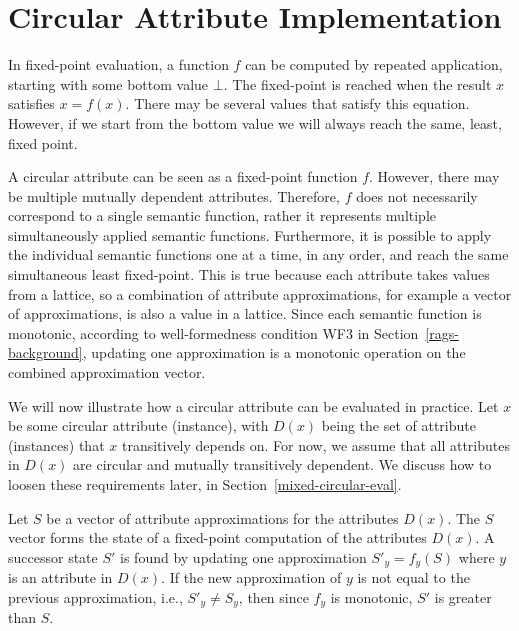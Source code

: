 {\section{Circular Attribute Implementation}
\label{circular-implementation}


In fixed-point evaluation, a function $f$ can be computed by repeated application, starting with
some bottom value $\bot$.
The fixed-point is reached when the result $x$ satisfies $x = f(x)$.
There may be several values that satisfy this equation. However, if we start from the
bottom value we will always reach the same, least, fixed point.

A circular attribute can be seen as a fixed-point function $f$. However, there may be
multiple mutually dependent attributes. Therefore, $f$ does not necessarily correspond
to a single semantic function, rather it represents multiple simultaneously
applied semantic functions.  Furthermore, it is possible to apply the individual semantic
functions one at a time, in any order, and reach the same simultaneous least
fixed-point. This is true because each attribute takes values from a lattice, so a combination of
attribute approximations, for example a vector of approximations,
is also a value in a lattice. Since each semantic function is monotonic,
according to well-formedness condition WF3 in Section~\ref{rags-background},
updating one approximation is a monotonic operation on the combined approximation vector.


We will now illustrate how a circular attribute can be evaluated in practice.
Let $x$ be some circular attribute (instance), with $D(x)$ being the set of
attribute (instances) that $x$ transitively depends on. For now, we assume that all
attributes in $D(x)$ are circular and mutually
transitively dependent. We discuss how to loosen these requirements later,
in Section~\ref{mixed-circular-eval}.

Let $S$ be a vector of attribute approximations for the attributes $D(x)$.
The $S$ vector forms the state of a fixed-point computation of the attributes $D(x)$.
A successor state $S'$ is found by updating one approximation $S'_y = f_y(S)$
where $y$ is an attribute in $D(x)$.
If the new approximation of $y$ is not equal to the previous approximation, i.e.,
$S'_y \ne S_y$, then since $f_y$ is monotonic, $S'$ is greater than $S$.

}
